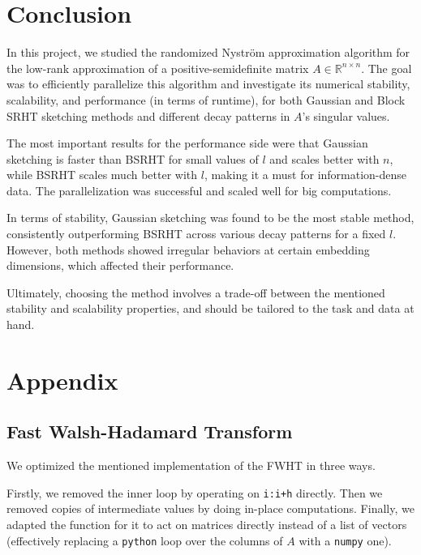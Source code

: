 \documentclass[a4paper, 12pt,oneside]{article}
\begin{document}
\section{Conclusion}
\vspace{-0.5em} %
\enlargethispage{\baselineskip} %

In this project, we studied the randomized Nystr\"om approximation algorithm for the low-rank approximation of a positive-semidefinite matrix $A \in \mathbb{R}^{n \times n}$. The goal was to efficiently parallelize this algorithm and investigate its numerical stability, scalability, and performance (in terms of runtime), for both Gaussian and Block SRHT sketching methods and different decay patterns in $A$'s singular values.

The most important results for the performance side were that Gaussian sketching is faster than BSRHT for small values of $l$ and scales better with $n$, while BSRHT scales much better with $l$, making it a must for information-dense data. The parallelization was successful and scaled well for big computations.

In terms of stability, Gaussian sketching was found to be the most stable method, consistently outperforming BSRHT across various decay patterns for a fixed $l$. However, both methods showed irregular behaviors at certain embedding dimensions, which affected their performance.

Ultimately, choosing the method involves a trade-off between the mentioned stability and scalability properties, and should be tailored to the task and data at hand.

\newpage
	\section*{Appendix}
	\subsection*{Fast Walsh-Hadamard Transform}\label{apx:FWHT}
	We optimized the mentioned implementation of the FWHT in three ways. 
	
	Firstly, we removed the inner loop by operating on \texttt{i:i+h} directly. Then we removed copies of intermediate values by doing in-place computations. Finally, we adapted the function for it to act on matrices directly instead of a list of vectors (effectively replacing a \texttt{python} loop over the columns of $A$ with a \texttt{numpy} one).
	
\end{document}
